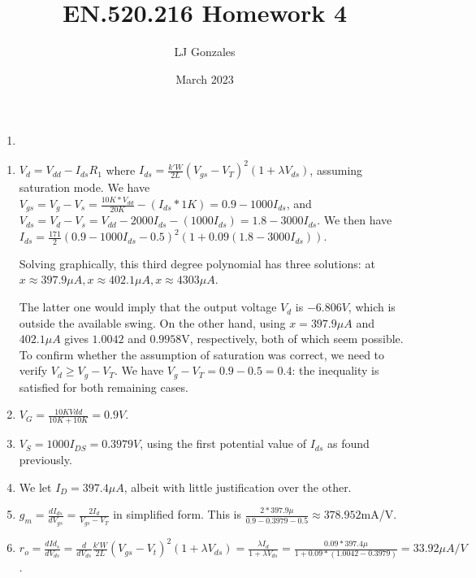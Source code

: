 \documentclass{article}
\title{EN.520.216 Homework 4}
\author{LJ Gonzales}
\date{March 2023}
\begin{document}
\maketitle
\begin{prob}
	\begin{enumerate}
	\item
	\end{enumerate}
\end{prob}

\begin{prob}
	\begin{enumerate}
	\item $V_d = V_{dd}-I_{ds}R_1$ where $I_{ds}=\frac{k'W}{2L}(V_{gs}-V_T)^2(1+\lambda V_{ds})$, assuming saturation mode.
We have $V_{gs}=V_g-V_s=\frac{10K*V_{dd}}{20K}-(I_{ds}*1K)=0.9-1000I_{ds}$, and $V_{ds}=V_d-V_s= V_{dd}-2000I_{ds}-(1000I_{ds})=1.8-3000I_{ds}$.
		We then have $I_{ds}=\frac{171}{2}(0.9-1000I_{ds}-0.5)^2(1+0.09(1.8-3000I_{ds}))$.

		Solving graphically, this third degree polynomial has three solutions: at $x\approx397.9\mu A, x\approx402.1\mu A ,x\approx4303\mu A$.
	
	The latter one would imply that the output voltage $V_d$ is $ -6.806V$, which is outside the available swing.
	On the other hand, using $x=397.9\mu A$ and $402.1\mu A$ gives $1.0042$ and $ 0.9958$V, respectively, both of which seem possible. \\
	To confirm whether the assumption of saturation was correct, we need to verify $V_{d} \geq V_{g}-V_T$.
	We have $V_g-V_T=0.9-0.5=0.4$: the inequality is satisfied for both remaining cases.
\item $V_G =\frac{10KVdd}{10K+10K}= 0.9V$.
\item $V_S = 1000I_{DS}= 0.3979V$, using the first potential value of $I_{ds}$ as found previously.
\item We let $I_{D}=397.4\mu A$, albeit with little justification over the other. 
\item $g_m=\frac{dI_{ds}}{dV_{gs}}=\frac{2I_d}{V_{gs}-V_T}$ in simplified form. This is $\frac{2*397.9\mu}{0.9-0.3979-0.5} \approx378.952$mA/V.
\item $r_o=\frac{dId_s}{dV_{ds}}=\frac{d}{dV_{ds}}\frac{k'W}{2L}(V_{gs}-V_t)^2(1+\lambda V_{ds})=\frac{\lambda I_d}{1+\lambda V_{ds}} =\frac{0.09*397.4\mu}{1+0.09*(1.0042-0.3979)}= 33.92\mu A/V$.
	\end{enumerate}
\end{prob}
\end{document}
